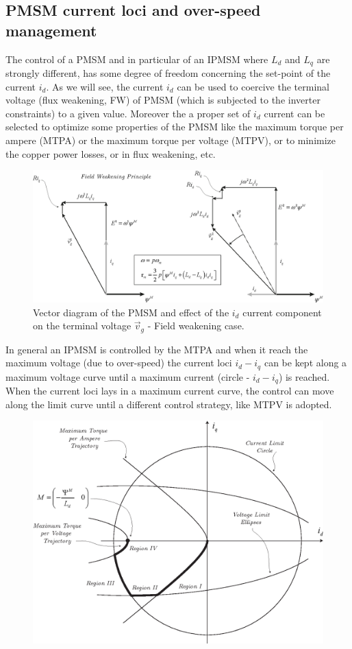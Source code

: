\documentclass[11pt,a4paper]{article}
\numberwithin{equation}{section}
\theoremstyle{it}
\theoremstyle{definition}
\begin{document}
\begin{onehalfspace}
\subsection{PMSM current loci and over-speed management}
The control of a PMSM and in particular of an IPMSM where $L_d$ and $L_q$ are strongly different, has some degree of freedom concerning the set-point of the current $i_d$. As we will see, the current $i_d$ can be used to coercive the terminal voltage (flux weakening, FW) of PMSM (which is subjected to the inverter constraints) to a given value. Moreover the a proper set of $i_d$ current can be selected to optimize some properties of the PMSM like the maximum torque per ampere (MTPA) or the maximum torque per voltage (MTPV), or to minimize the copper power losses, or in flux weakening, etc.
\begin{figure}[H]
	\centering
	\includegraphics[width = 400pt, keepaspectratio]{figures/pmsm/pmsm_vector_graph_2.eps}
	\captionsetup{width=0.5\textwidth, font=small}
	\caption{Vector diagram of the PMSM and effect of the $i_d$ current component on the terminal voltage $\vec{v}_g$ - Field weakening case.}
	\label{vector_plane_2}
\end{figure}
In general an IPMSM is controlled by the MTPA and when it reach the maximum voltage (due to over-speed) the current loci $i_d-i_q$ can be kept along a maximum voltage curve until a maximum current (circle - $i_d-i_q$) is reached. When the current loci lays in a maximum current curve, the control can move along the limit curve until a different control strategy, like MTPV is adopted.
\begin{figure}[H]
	\centering
	\includegraphics[width = 360pt, keepaspectratio]{figures/deflux/deflux_bianchi_3b.eps}

\end{figure}
\end{onehalfspace}
\end{document}
